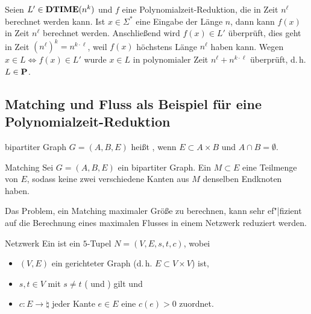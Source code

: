 \begin{Beweis}
    Seien $L' \in \DTIME(n^k)$ und $f$ eine Polynomialzeit-Reduktion, die in
    Zeit $n^\ell$ berechnet werden kann.
    Ist $x \in \Sigma^\ast$ eine Eingabe der Länge $n$, dann
    kann $f(x)$ in Zeit $n^\ell$ berechnet werden.
    Anschließend wird $f(x) \in L'$ überprüft, dies geht in Zeit $(n^\ell)^k = n^{k \cdot \ell}$,
    weil $f(x)$ höchstens Länge $n^\ell$ haben kann.
    Wegen $x \in L \iff f(x) \in L'$ wurde $x \in L$ in
    polynomialer Zeit $n^\ell + n^{k \cdot \ell}$ überprüft, d.\,h. $L \in \P$.
\end{Beweis}

\subsection{%
    Matching und Fluss als Beispiel für eine Polynomialzeit-Reduktion%
}

\begin{Def}{bipartiter Graph}
    $G = (A, B, E)$ heißt , wenn $E \subset A \times B$
    und $A \cap B = \emptyset$.
\end{Def}

\begin{Def}{Matching}
    Sei $G = (A, B, E)$ ein bipartiter Graph.
    Ein  $M \subset E$ eine Teilmenge von $E$, sodass keine zwei
    verschiedene Kanten aus $M$ denselben Endknoten haben.
\end{Def}

\linie

\begin{Bem}
    Das Problem, ein Matching maximaler Größe zu berechnen,
    kann sehr ef"|fizient auf die Berechnung eines maximalen Flusses in einem Netzwerk
    reduziert werden.
\end{Bem}

\begin{Def}{Netzwerk}
    Ein  ist ein $5$-Tupel $N = (V, E, s, t, c)$, wobei
    \begin{itemize}
        \item
        $(V, E)$ ein gerichteter Graph (d.\,h. $E \subset V \times V$) ist,
        
        \item
        $s, t \in V$ mit $s \not= t$ ( und ) gilt und
        
        \item
        $c\colon E \rightarrow \natural$ jeder Kante $e \in E$ eine 
        $c(e) > 0$ zuordnet.
    \end{itemize}
\end{Def}

